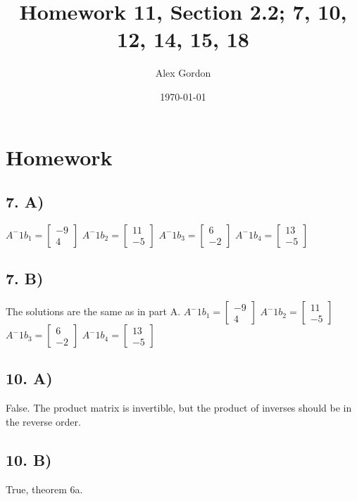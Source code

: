 \documentclass[12]{scrartcl}
\begin{document}
\title{Homework 11, Section 2.2; 7, 10, 12, 14, 15, 18}
\author{Alex Gordon}
\date{\today}
\maketitle
\section*{Homework}
\subsection*{7. A)}
$A^-1b_1 = \begin{bmatrix} -9 \\ 4   \end{bmatrix}$
$A^-1b_2 = \begin{bmatrix} 11 \\ -5   \end{bmatrix}$
$A^-1b_3 = \begin{bmatrix} 6 \\ -2   \end{bmatrix}$
$A^-1b_4 = \begin{bmatrix} 13 \\ -5   \end{bmatrix}$
\subsection*{7. B)}
The solutions are the same as in part A. 
$A^-1b_1 = \begin{bmatrix} -9 \\ 4   \end{bmatrix}$
$A^-1b_2 = \begin{bmatrix} 11 \\ -5   \end{bmatrix}$
$A^-1b_3 = \begin{bmatrix} 6 \\ -2   \end{bmatrix}$
$A^-1b_4 = \begin{bmatrix} 13 \\ -5   \end{bmatrix}$

\subsection*{10. A)}
False. The product matrix is invertible, but the product of inverses should be in the reverse order. 
\subsection*{10. B)}
True, theorem 6a.
\end{document}

